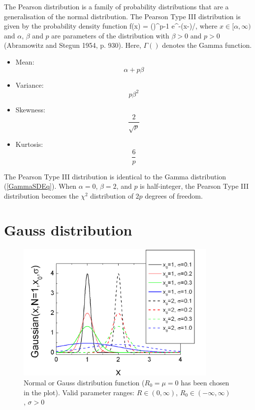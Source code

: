 The Pearson distribution is a family of probability distributions
that are a generalisation of the normal distribution. The Pearson
Type III distribution is given by the probability density function
\BE
    f(x) =  \left(\right)^{p-1} e^{-(x-\alpha)/\beta}, \!
\EE where $x \in [\alpha,\infty)$ and $\alpha$, $\beta$ and $p$
are parameters of the distribution with $\beta > 0$ and $p > 0$
(Abramowitz and Stegun 1954, p. 930). Here, $\Gamma ()$ denotes
the Gamma function.
\begin{itemize}
\item Mean:
$$
    \alpha + p\beta
$$
\item Variance:
$$
    p\beta^2
$$
\item Skewness:
$$
    \frac{2}{\sqrt{p}}
$$
\item Kurtosis:
$$
    \frac{6}{p}
$$
\end{itemize}
The Pearson Type III distribution is identical to the Gamma
distribution (\ref{GammaSDEq}). When $\alpha=0$, $\beta=2$, and
$p$ is half-integer, the Pearson Type III distribution becomes the
$\chi^2$ distribution of $2p$ degrees of freedom.


\clearpage
\section{Gauss distribution}

\begin{figure}[htb]
\begin{center}
\includegraphics[width=0.873\textwidth]{GaussSD.png}
\end{center}
\caption{Normal or Gauss distribution function ($R_0=\mu=0$ has
been chosen in the plot). Valid parameter ranges: $R \in
(0,\infty)$, $R_0 \in (-\infty,\infty)$, $\sigma>0$}
\label{NormalDistr}
\end{figure}

